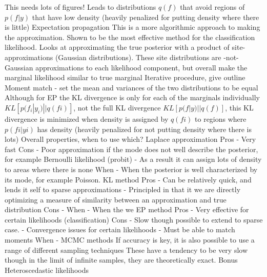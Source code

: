 \documentclass[serif, mathserif, professionalfont]{beamer} %
\begin{document}
{        This needs lots of figures!
        Leads to distributions $q(f)$ that avoid regions of $p(f|y)$ that have low density (heavily penalized for putting density where there is little)
    Expectation propagation
        This is a more algorithmic approach to making the approximation. Shown to be the most effective method for the classification likelihood.
        Looks at approximating the true posterior with a product of site-approximations (Gaussian distributions).
        These site distributions are -not- Gaussian approximations to each likelihood component, but overall make the marginal likelihood similar to true marginal
        Iterative procedure, give outline
        Moment match - set the mean and variances of the two distributions to be equal
        Although for EP the KL divergence is only for each of the marginals individually $KL[p(f_i|y_i)||q(fi)]$, not the full KL divergence $KL[p(f|y)||q(f)]$, this KL divergence is minimized when density is assigned by $q(fi)$ to regions where $p(fi|yi)$ has density (heavily penalized for not putting density where there is lots)
    Overall properties, when to use which?
        Laplace approximation 
            Pros - Very fast
            Cons - Poor approximation if the mode does not well describe the posterior, for example Bernoulli likelihood (probit)
                 - As a result it can assign lots of density to areas where there is none
            When - When the posterior is well characterized by its mode, for example Poisson.
        KL method
            Pros - Can be relatively quick, and lends it self to sparse approximations
                 - Principled in that it we are directly optimizing a measure of similarity between an approximation and true distribution
            Cons - 
            When - When the we 
        EP method
            Pros - Very effective for certain likelihoods (classification)
            Cons - Slow though possible to extend to sparse case. 
                 - Convergence issues for certain likelihoods
                 - Must be able to match moments
            When -
        MCMC methods
            If accuracy is key, it is also possible to use a range of different sampling techniques
            These have a tendency to be very slow though in the limit of infinite samples, they are theoretically exact.
        \cite{Approximations for Binary Gaussian Process Classification}
    Bonus
        Heteroscedastic likelihoods
}
\end{document}
